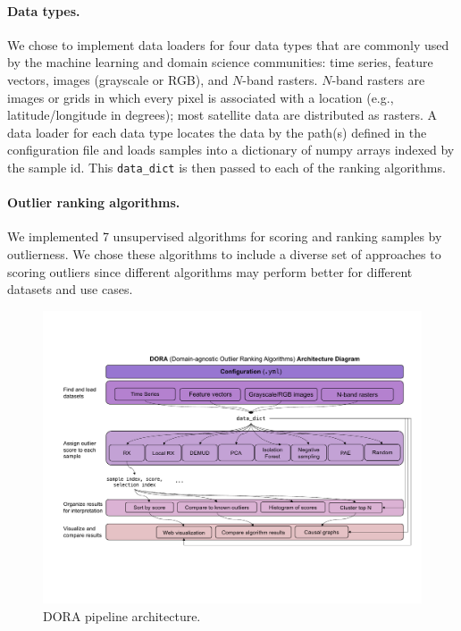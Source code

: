 \documentclass[letterpaper]{article} %
\begin{document}
\paragraph{Data types.} We chose to implement data loaders for four
data types that are commonly used by the machine learning and domain science
communities: time series, feature vectors, images (grayscale or RGB), and 
$N$-band rasters. $N$-band rasters are images or grids in which every pixel
is associated with a location (e.g., latitude/longitude in degrees); 
most satellite data are distributed as rasters.
A data loader for each data type locates the data by the path(s)
defined in the configuration file and loads samples into a dictionary of numpy
 arrays indexed by the sample id. This \texttt{data\_dict} is then passed to each of the ranking algorithms.

\paragraph{Outlier ranking algorithms.} We implemented 7 unsupervised 
algorithms for scoring and 
ranking samples by outlierness. 
We chose these algorithms to include a diverse
set of approaches to scoring outliers since different algorithms may  
perform better for different datasets and use cases. 

\begin{figure}
    \centering
    \includegraphics[width=\linewidth]{figures/dora-system-diagram-v5.pdf}
    \caption{DORA pipeline architecture.}
    \label{fig:dora}
\end{figure}
\end{document}

